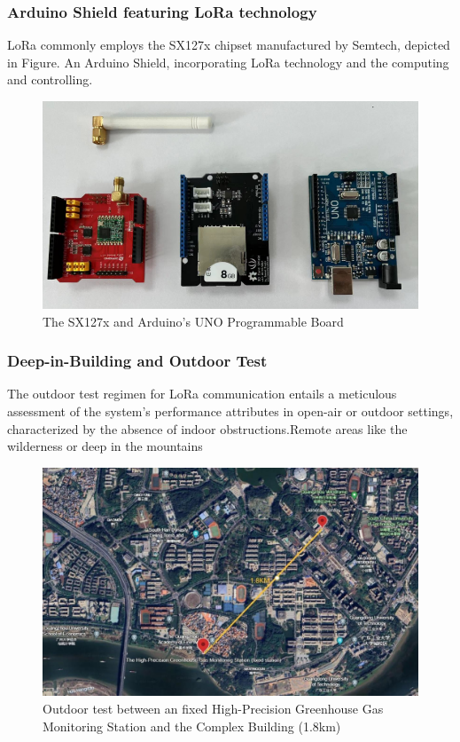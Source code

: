 \documentclass{beamer}
\begin{document}
\begin{frame}
  \frametitle{Arduino Shield featuring LoRa technology}
  LoRa commonly employs the SX127x chipset manufactured by Semtech, depicted in Figure. An Arduino Shield, incorporating LoRa technology and the computing and controlling.
  \begin{figure}
    \centering
    \includegraphics[width=0.6\linewidth]{../figures/fig3-3.png}
    \caption{The SX127x and Arduino’s UNO Programmable Board}
    \label{fig:3-3}
  \end{figure}
\end{frame}

\begin{frame}
  \frametitle{Deep-in-Building and Outdoor Test}
  The outdoor test regimen for LoRa communication entails a meticulous assessment of the system's performance attributes in open-air or outdoor settings, characterized by the absence of indoor obstructions.Remote areas like the wilderness or deep in the mountains
  \begin{figure}
    \centering
    \includegraphics[width=0.55\linewidth]{../figures/fig3-4.png}
    \caption{Outdoor test between an fixed High-Precision Greenhouse Gas Monitoring Station and the Complex Building (1.8km)}
    \label{fig:3-4}
  \end{figure}
\end{frame}
\end{document}
